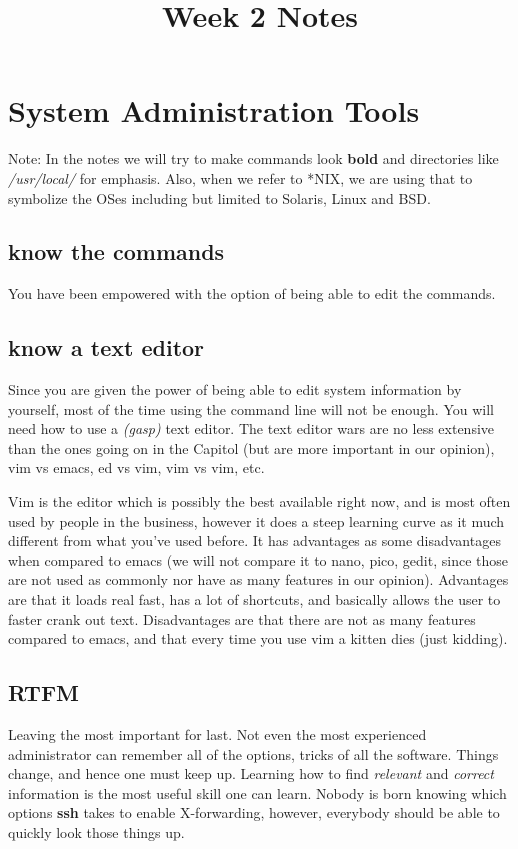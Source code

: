 \documentclass[10pt]{article}
\title{Week 2 Notes}
\begin{document}
\maketitle
\section{System Administration Tools}
Note: In the notes we will try to make commands look {\bf bold} and directories like \emph{/usr/local/} for emphasis. Also, when we refer to *NIX, we are using that to symbolize the OSes including but limited to Solaris, Linux and BSD.
\subsection{know the commands}
You have been empowered with the option of being able to edit the commands.
\subsection{know a text editor}
Since you are given the power of being able to edit system information by yourself, most of the time using the command line will not be enough. You will need how to use a \emph{(gasp)} text editor. The text editor wars are no less extensive than the ones going on in the Capitol (but are more important in our opinion),  vim vs emacs, ed vs vim, vim vs vim, etc. 

Vim is the editor which is possibly the best available right now, and is most often used by people in the business, however it does a steep learning curve as it much different from what you've used before. It has advantages as some disadvantages when compared to emacs (we will not compare it to nano, pico, gedit, since those are not used as commonly nor have as many features in our opinion). Advantages are that it loads real fast, has a lot of shortcuts, and basically allows the user to faster crank out text. Disadvantages are that there are not as many features compared to emacs, and that every time you use vim a kitten dies (just kidding).
\subsection{RTFM}
Leaving the most important for last. Not even the most experienced administrator can remember all of the options, tricks of all the software. Things change, and hence one must keep up. Learning how to find \emph{relevant} and \emph{correct} information is the most useful skill one can learn. Nobody is born knowing which options {\bf ssh} takes to enable X-forwarding, however, everybody should be able to quickly look those things up.
\end{document}
